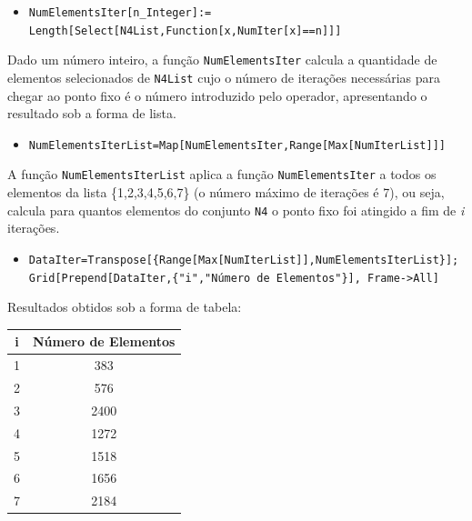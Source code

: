 \documentclass[12pt,a4paper]{article}
\begin{document}
        \begin{itemize}
            \item \texttt{NumElementsIter[n\_Integer]:= Length[Select[N4List,Function[x,NumIter[x]==n]]]}
        \end{itemize}

        Dado um número inteiro, a função \texttt{NumElementsIter} calcula a quantidade de elementos selecionados de \texttt{N4List} cujo o número de iterações necessárias para chegar ao ponto fixo é o número introduzido pelo operador, apresentando o resultado sob a forma de lista.

        \begin{itemize}
            \item \texttt{NumElementsIterList=Map[NumElementsIter,Range[Max[NumIterList]]]}
        \end{itemize}

        A função \texttt{NumElementsIterList} aplica a função \texttt{NumElementsIter} a todos os elementos da lista \{1,2,3,4,5,6,7\} (o número máximo de iterações é 7), ou seja, calcula para quantos elementos do conjunto \texttt{N4} o ponto fixo foi atingido a fim de \textit{i} iterações.

        \newpage
        \begin{itemize}
            \item \texttt{DataIter=Transpose[\{Range[Max[NumIterList]],NumElementsIterList\}]; \\ Grid[Prepend[DataIter,\{"i","Número de Elementos"\}], Frame->All]}
        \end{itemize}

        Resultados obtidos sob a forma de tabela:
        \begin{table}[h!]
            \centering
            \begin{tabular}{|c|c|}
                \hline
                \textbf{i} & \textbf{Número de Elementos} \\
                \hline
                1 & 383 \\
                2 & 576 \\
                3 & 2400 \\
                4 & 1272 \\
                5 & 1518 \\
                6 & 1656 \\
                7 & 2184 \\
                \hline
            \end{tabular}
        \end{table}
\end{document}
